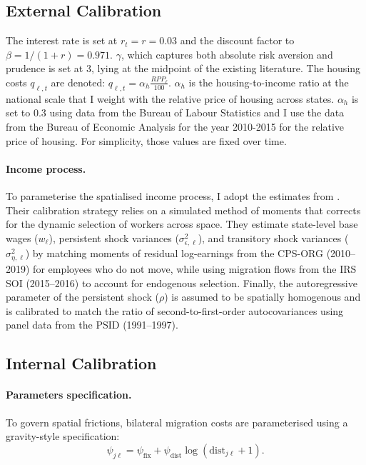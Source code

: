 \documentclass[11pt, a4paper]{article}
\begin{document}
\subsection{External Calibration}
The interest rate is set at $r_t = r = 0.03$ and the discount factor to $\beta = 1/(1+r) = 0.971$. $\gamma$, which captures both absolute risk aversion and prudence is set at 3, lying at the midpoint of the existing literature. The housing costs $q_{\ell, t}$ are denoted: $q_{\ell, t} = \alpha_h \frac{RPP_\ell}{100}$. $\alpha_h$ is the housing-to-income ratio at the national scale that I weight with the relative price of housing across states. $\alpha_h$ is set to 0.3 using data from the Bureau of Labour Statistics and I use the data from the Bureau of Economic Analysis for the year 2010-2015 for the relative price of housing. For simplicity, those values are fixed over time.
\paragraph{Income process.} To parameterise the spatialised income process, I adopt the estimates from \citet{dvorkin_geography_2025}. Their calibration strategy relies on a simulated method of moments that corrects for the dynamic selection of workers across space. They estimate state-level base wages ($w_\ell$), persistent shock variances ($\sigma_{\epsilon,\ell}^2$), and transitory shock variances ($\sigma_{\eta,\ell}^2$) by matching moments of residual log-earnings from the CPS-ORG (2010--2019) for employees who do not move, while using migration flows from the IRS SOI (2015--2016) to account for endogenous selection. Finally, the autoregressive parameter of the persistent shock ($\rho$) is assumed to be spatially homogenous and is calibrated to match the ratio of second-to-first-order autocovariances using panel data from the PSID (1991--1997).

\subsection{Internal Calibration}

\paragraph{Parameters specification.} To govern spatial frictions, bilateral migration costs are parameterised using a gravity-style specification: \begin{equation}
  \psi_{j\ell} = \psi_{\text{fix}} + \psi_{\text{dist}} \log(\text{dist}_{j\ell} + 1).
\end{equation}
\end{document}
